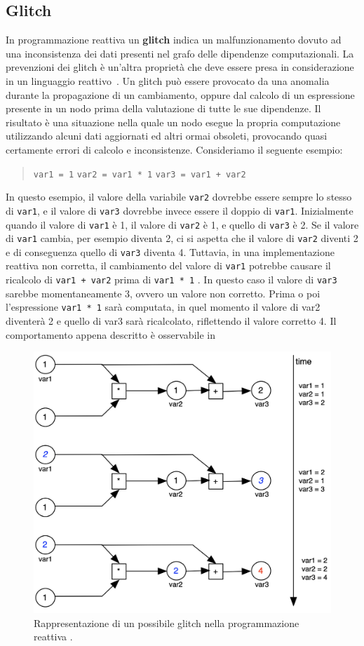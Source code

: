 \documentclass[12pt,a4paper,openright,twoside]{book}
\begin{document}
\subsection{Glitch}
In programmazione reattiva un \textbf{glitch} indica un malfunzionamento dovuto ad una inconsistenza dei dati presenti nel grafo delle dipendenze computazionali. La prevenzioni dei glitch è un'altra proprietà che deve essere presa in considerazione in un linguaggio reattivo~\cite{DBLP:journals/csur/BainomugishaCCMM13}.
Un glitch può essere provocato da una anomalia durante la propagazione di un cambiamento, oppure dal calcolo di un espressione presente in un nodo prima della valutazione di tutte le sue dipendenze. Il risultato è una situazione nella quale un nodo esegue la propria computazione utilizzando alcuni dati aggiornati ed altri ormai obsoleti, provocando quasi certamente errori di calcolo e inconsistenze. 
Consideriamo il seguente esempio: 
\begin{quotation}
    \texttt{var1 = 1}
    \texttt{var2 = var1 * 1}
    \texttt{var3 = var1 + var2}
\end{quotation} 
In questo esempio, il valore della variabile \texttt{var2} dovrebbe essere sempre lo stesso di \texttt{var1}, e il valore di \texttt{var3} dovrebbe invece essere il doppio di \texttt{var1}. Inizialmente quando il valore di \texttt{var1} è 1, il valore di \texttt{var2} è 1, e quello di \texttt{var3} è 2. Se il valore di \texttt{var1} cambia, per esempio diventa 2, ci si aspetta che il valore di \texttt{var2} diventi 2 e di conseguenza quello di \texttt{var3} diventa 4. Tuttavia, in una implementazione reattiva non corretta, il cambiamento del valore di \texttt{var1} potrebbe causare il ricalcolo di \texttt{var1 + var2} prima di \texttt{var1 * 1} . In questo caso il valore di \texttt{var3} sarebbe momentaneamente 3, ovvero un valore non corretto.
Prima o poi l'espressione \texttt{var1 * 1} sarà computata, in quel momento il valore di var2 diventerà 2 e quello di var3 sarà ricalcolato, riflettendo il valore corretto 4. Il comportamento appena descritto è osservabile in 

\begin{figure}
    \centering
    \includegraphics[width=.65\linewidth]{figures/reactive-programming/RP-glitch.png}
    \caption{Rappresentazione di un possibile glitch nella programmazione reattiva \cite{DBLP:journals/csur/BainomugishaCCMM13}.}
    \label{fig:rp-glitch}
\end{figure}
\end{document}
